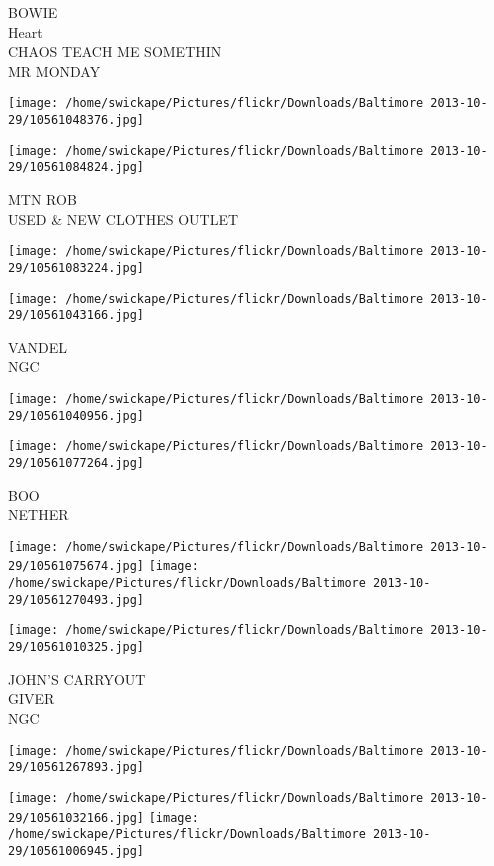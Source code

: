 \documentclass[10pt,letterpaper]{article}
\begin{document}
BOWIE\\
Heart\\
CHAOS TEACH ME SOMETHIN\\
MR MONDAY
\pagebreak

\texttt{[image: /home/swickape/Pictures/flickr/Downloads/Baltimore 2013-10-29/10561048376.jpg]}

\vspace{0.25in}
\texttt{[image: /home/swickape/Pictures/flickr/Downloads/Baltimore 2013-10-29/10561084824.jpg]}

MTN ROB\\
USED \& NEW CLOTHES OUTLET
\pagebreak

\texttt{[image: /home/swickape/Pictures/flickr/Downloads/Baltimore 2013-10-29/10561083224.jpg]}

\vspace{0.25in}
\texttt{[image: /home/swickape/Pictures/flickr/Downloads/Baltimore 2013-10-29/10561043166.jpg]}

VANDEL\\
NGC
\pagebreak

\texttt{[image: /home/swickape/Pictures/flickr/Downloads/Baltimore 2013-10-29/10561040956.jpg]}

\vspace{0.25in}
\texttt{[image: /home/swickape/Pictures/flickr/Downloads/Baltimore 2013-10-29/10561077264.jpg]}

BOO\\
NETHER
\pagebreak

\texttt{[image: /home/swickape/Pictures/flickr/Downloads/Baltimore 2013-10-29/10561075674.jpg]}
\texttt{[image: /home/swickape/Pictures/flickr/Downloads/Baltimore 2013-10-29/10561270493.jpg]}

\texttt{[image: /home/swickape/Pictures/flickr/Downloads/Baltimore 2013-10-29/10561010325.jpg]}

JOHN'S CARRYOUT\\
GIVER\\
NGC
\pagebreak

\texttt{[image: /home/swickape/Pictures/flickr/Downloads/Baltimore 2013-10-29/10561267893.jpg]}

\vspace{0.25in}
\texttt{[image: /home/swickape/Pictures/flickr/Downloads/Baltimore 2013-10-29/10561032166.jpg]}
\texttt{[image: /home/swickape/Pictures/flickr/Downloads/Baltimore 2013-10-29/10561006945.jpg]}
\end{document}
